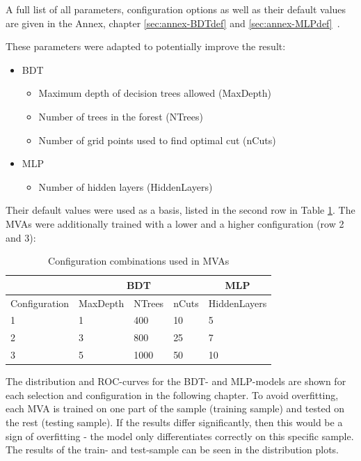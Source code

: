 \documentclass[11pt]{scrartcl}
\begin{document}
	A full list of all parameters, configuration options as well as their default values are given in the Annex, chapter \ref{sec:annex-BDTdef} and \ref{sec:annex-MLPdef}~\cite{TMVA}.
	
	These parameters were adapted to potentially improve the result:
		\begin{itemize}
  			\item BDT
  					\begin{itemize}
  					\item Maximum depth of decision trees allowed (MaxDepth)
  					\item Number of trees in the forest (NTrees)
  					\item Number of grid points used to find optimal cut (nCuts)
  					\end{itemize}
  		  	\item MLP
  					\begin{itemize}
  					\item Number of hidden layers (HiddenLayers)
  					\end{itemize}		
		\end{itemize}
		
	Their default values were used as a basis, listed in the second row in Table \ref{tab:config}. The MVAs were additionally trained with a lower and a higher configuration (row 2 and 3):
	
	\begin{table}[H]
	\begin{center}
	\begin{tabular}{|l|l|l|l|l|}
	\hline
	              & \multicolumn{3}{c|}{BDT}                         & \multicolumn{1}{c|}{MLP} \\ \hline
	Configuration & MaxDepth & NTrees & nCuts & HiddenLayers         \\ \hline
	1             & 1             & 400             & 10             & 5                        \\ \hline
	2             & 3             & 800             & 25             & 7                        \\ \hline
	3             & 5             & 1000            & 50             & 10                       \\ \hline
	\end{tabular}
		\caption{Configuration combinations used in MVAs}
		\label{tab:config}
	\end{center}
	\end{table}

	
The distribution and ROC-curves for the BDT- and MLP-models are shown for each selection and configuration in the following chapter. To avoid overfitting, each MVA is trained on one part of the sample (training sample) and tested on the rest (testing sample). If the results differ significantly, then this would be a sign of overfitting - the model only differentiates correctly on this specific sample. The results of the train- and test-sample can be seen in the distribution plots.
\end{document}
